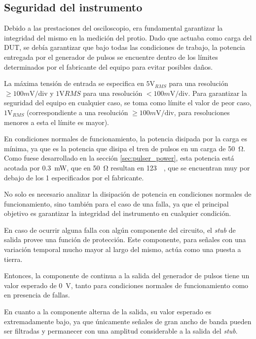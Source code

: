 \subsection{Seguridad del instrumento}

Debido a las prestaciones del osciloscopio, era fundamental garantizar la
integridad del mismo en la medición del protio. Dado que actuaba como carga del
DUT, se debía garantizar que bajo todas las condiciones de
trabajo, la potencia entregada por el generador de pulsos se encuentre dentro de
los límites determinados por el fabricante del equipo para evitar posibles daños.

La máxima tensión de entrada se especifica en $5\text{V}_{RMS}$ para una
resolución $\geq100m\text{V}/\text{div}$ y $1 \text{V}{RMS}$ para una resolución
$<100 m\text{V}/\text{div}$.  Para garantizar la seguridad del equipo en
cualquier caso, se toma como límite el valor de peor caso, $1\text{V}_{RMS}$
(correspondiente a una resolución $\geq 100 m\text{V/div}$, para resoluciones
menores a esta el límite es mayor).

En condiciones normales de funcionamiento, la potencia disipada por la carga es
mínima, ya que es la potencia que disipa el tren de pulsos en un carga de
\qty{50}{\ohm}. Como fuese desarrollado en la sección \ref{sec:pulser_power},
esta potencia está acotada por \qty{0.3}{\milli\watt}, que en \qty{50}{\ohm}
resultan en \qty{123}{\milli\voltRMS}, que se encuentran muy por debajo de los
\qty{1}{\voltRMS} especificados por el fabricante.

No solo es necesario analizar la disipación de potencia en condiciones normales
de funcionamiento, sino también para el caso de una falla, ya que el principal
objetivo es garantizar la integridad del instrumento en cualquier condición.

En caso de ocurrir alguna falla con algún componente del circuito, el \textit{stub}
de salida provee una función de protección. Este componente, para señales con
una variación temporal mucho mayor al largo del mismo, actúa como una puesta a
tierra.

Entonces, la componente de continua a la salida del generador de pulsos tiene un
valor esperado de \qty{0}{\volt}, tanto para condiciones normales de 
funcionamiento como en presencia de fallas.

En cuanto a la componente alterna de la salida, su valor esperado es
extremadamente bajo, ya que únicamente señales de gran ancho de banda pueden ser
filtradas y permanecer con una amplitud considerable a la salida del 
\textit{stub}.

